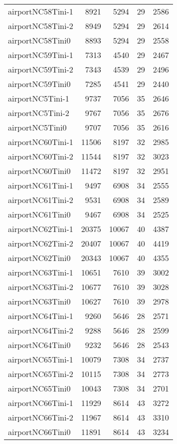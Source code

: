 \begin{longtable}{lrrrr}
airportNC58Tini-1 & 8921 & 5294 & 29 & 2586 \\
airportNC58Tini-2 & 8949 & 5294 & 29 & 2614 \\
airportNC58Tini0 & 8893 & 5294 & 29 & 2558 \\
airportNC59Tini-1 & 7313 & 4540 & 29 & 2467 \\
airportNC59Tini-2 & 7343 & 4539 & 29 & 2496 \\
airportNC59Tini0 & 7285 & 4541 & 29 & 2440 \\
airportNC5Tini-1 & 9737 & 7056 & 35 & 2646 \\
airportNC5Tini-2 & 9767 & 7056 & 35 & 2676 \\
airportNC5Tini0 & 9707 & 7056 & 35 & 2616 \\
airportNC60Tini-1 & 11506 & 8197 & 32 & 2985 \\
airportNC60Tini-2 & 11544 & 8197 & 32 & 3023 \\
airportNC60Tini0 & 11472 & 8197 & 32 & 2951 \\
airportNC61Tini-1 & 9497 & 6908 & 34 & 2555 \\
airportNC61Tini-2 & 9531 & 6908 & 34 & 2589 \\
airportNC61Tini0 & 9467 & 6908 & 34 & 2525 \\
airportNC62Tini-1 & 20375 & 10067 & 40 & 4387 \\
airportNC62Tini-2 & 20407 & 10067 & 40 & 4419 \\
airportNC62Tini0 & 20343 & 10067 & 40 & 4355 \\
airportNC63Tini-1 & 10651 & 7610 & 39 & 3002 \\
airportNC63Tini-2 & 10677 & 7610 & 39 & 3028 \\
airportNC63Tini0 & 10627 & 7610 & 39 & 2978 \\
airportNC64Tini-1 & 9260 & 5646 & 28 & 2571 \\
airportNC64Tini-2 & 9288 & 5646 & 28 & 2599 \\
airportNC64Tini0 & 9232 & 5646 & 28 & 2543 \\
airportNC65Tini-1 & 10079 & 7308 & 34 & 2737 \\
airportNC65Tini-2 & 10115 & 7308 & 34 & 2773 \\
airportNC65Tini0 & 10043 & 7308 & 34 & 2701 \\
airportNC66Tini-1 & 11929 & 8614 & 43 & 3272 \\
airportNC66Tini-2 & 11967 & 8614 & 43 & 3310 \\
airportNC66Tini0 & 11891 & 8614 & 43 & 3234 \\

\end{longtable}
